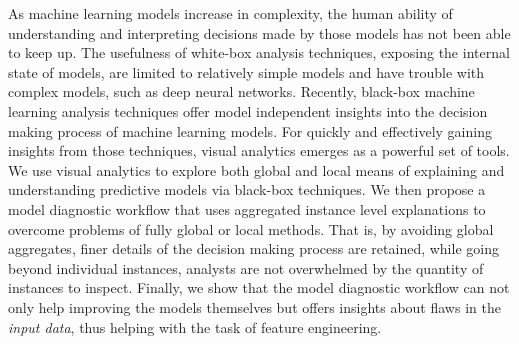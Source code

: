 As machine learning models increase in complexity, the human ability of understanding and interpreting decisions made by those models has not been able to keep up.
The usefulness of white-box analysis techniques, exposing the internal state of models, are limited to relatively simple models and have trouble with complex models, such as deep neural networks.
Recently, black-box machine learning analysis techniques offer model independent insights into the decision making process of machine learning models.
For quickly and effectively gaining insights from those techniques, visual analytics emerges as a powerful set of tools.
We use visual analytics to explore both global and local means of explaining and understanding predictive models via black-box techniques.
We then propose a model diagnostic workflow that uses aggregated instance level explanations to overcome problems of fully global or local methods.
That is, by avoiding global aggregates, finer details of the decision making process are retained, while going beyond individual instances, analysts are not overwhelmed by the quantity of instances to inspect.
Finally, we show that the model diagnostic workflow can not only help improving the models themselves but offers insights about flaws in the \emph{input data}, thus helping with the task of feature engineering.


